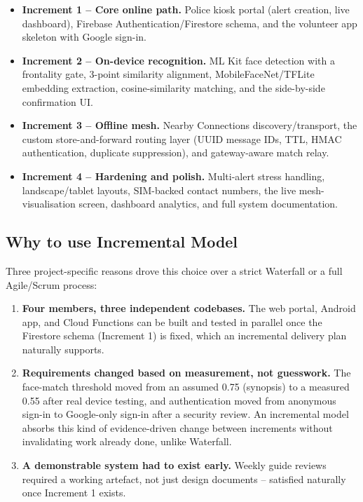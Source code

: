 \documentclass[12pt,a4paper,oneside]{report}
\begin{document}
\begin{itemize}
  \item \textbf{Increment 1 -- Core online path.} Police kiosk portal
        (alert creation, live dashboard), Firebase Authentication/Firestore
        schema, and the volunteer app skeleton with Google sign-in.
  \item \textbf{Increment 2 -- On-device recognition.} ML Kit face
        detection with a frontality gate, 3-point similarity alignment,
        MobileFaceNet/TFLite embedding extraction, cosine-similarity
        matching, and the side-by-side confirmation UI.
  \item \textbf{Increment 3 -- Offline mesh.} Nearby Connections
        discovery/transport, the custom store-and-forward routing layer
        (UUID message IDs, TTL, HMAC authentication, duplicate
        suppression), and gateway-aware match relay.
  \item \textbf{Increment 4 -- Hardening and polish.} Multi-alert stress
        handling, landscape/tablet layouts, SIM-backed contact numbers,
        the live mesh-visualisation screen, dashboard analytics, and full
        system documentation.
  \end{itemize}

\subsection{Why to use Incremental Model}

Three project-specific reasons drove this choice over a strict Waterfall or
a full Agile/Scrum process:

\begin{enumerate}
  \item \textbf{Four members, three independent codebases.} The web portal,
        Android app, and Cloud Functions can be built and tested in
        parallel once the Firestore schema (Increment 1) is fixed, which an
        incremental delivery plan naturally supports.
  \item \textbf{Requirements changed based on measurement, not guesswork.}
        The face-match threshold moved from an assumed 0.75 (synopsis) to a
        measured 0.55 after real device testing, and authentication moved
        from anonymous sign-in to Google-only sign-in after a security
        review. An incremental model absorbs this kind of evidence-driven
        change between increments without invalidating work already done,
        unlike Waterfall.
  \item \textbf{A demonstrable system had to exist early.} Weekly guide
        reviews required a working artefact, not just design documents --
        satisfied naturally once Increment 1 exists.
\end{enumerate}
\end{document}
